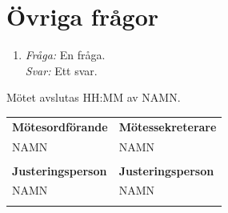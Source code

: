 \documentclass[a4paper]{article}
\begin{document}
\section{Övriga frågor}

\begin{enumerate}
\def\labelenumi{\arabic{enumi}.}
\item \emph{Fråga:} En fråga. \\
    \emph{Svar:} Ett svar.
\end{enumerate}

Mötet avslutas HH:MM av NAMN.

\vspace{2em}

\begin{center}
\begin{tabular}{@{}p{}p{}@{}}
  \textbf{Mötesordförande} & \textbf{Mötessekreterare} \\[0.3em]
  NAMN & NAMN \\
  \vspace{8em} &\\
  \textbf{Justeringsperson} & \textbf{Justeringsperson} \\[0.3em]
  NAMN & NAMN \\
  \vspace{8em} &\\
\end{tabular}
\end{center}
\end{document}
